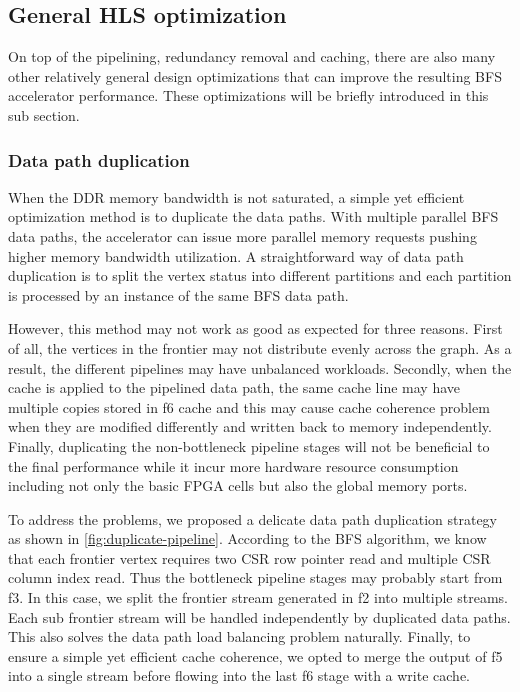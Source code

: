 \subsection{General HLS optimization}
On top of the pipelining, redundancy removal and caching, there are also 
many other relatively general design optimizations that can improve the 
resulting BFS accelerator performance. These optimizations will be briefly 
introduced in this sub section.

\subsubsection{Data path duplication}
When the DDR memory bandwidth is not saturated, a simple 
yet efficient optimization method is to duplicate the data paths. 
With multiple parallel BFS data paths, the accelerator can issue more parallel 
memory requests pushing higher memory bandwidth utilization. A straightforward 
way of data path duplication is to split the vertex status into different 
partitions and each partition is processed by an instance of the same BFS data path.

However, this method may not work as good as expected for three reasons. 
First of all, the vertices in the frontier may not distribute evenly across the graph. 
As a result, the different pipelines may have unbalanced workloads. Secondly, 
when the cache is applied to the pipelined data path, the same cache line may 
have multiple copies stored in f6 cache and this may cause 
cache coherence problem when they are modified differently 
and written back to memory independently. Finally, duplicating 
the non-bottleneck pipeline stages will not be beneficial to 
the final performance while it incur more hardware resource consumption 
including not only the basic FPGA cells but also the global memory ports. 

To address the problems, we proposed a delicate data path duplication strategy 
as shown in \ref{fig:duplicate-pipeline}. According to the BFS algorithm, 
we know that each frontier vertex requires two CSR row pointer read and multiple 
CSR column index read. Thus the bottleneck pipeline stages may probably start 
from f3. In this case, we split the frontier stream generated in f2 into 
multiple streams. Each sub frontier stream will be handled independently by 
duplicated data paths. This also solves the data path load balancing problem 
naturally. Finally, to ensure a simple yet efficient cache coherence, we opted 
to merge the output of f5 into a single stream before flowing into the 
last f6 stage with a write cache. 

